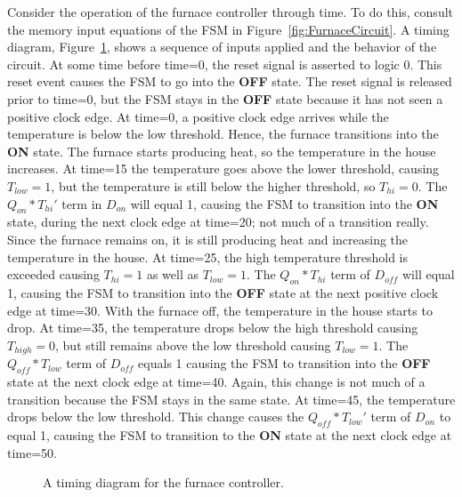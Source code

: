 Consider the operation of the furnace controller through time.
To do this, consult the memory input equations of the
FSM in Figure~\ref{fig:FurnaceCircuit}.  A timing diagram, Figure~\ref{fig:FurnaceTime}, 
shows a sequence of inputs applied and the
behavior of the circuit. At some time before time=0, the reset signal is
asserted to logic 0.  This reset event causes the FSM to go into the 
{\bf OFF} state.  The 
reset signal is released prior to time=0, but the FSM stays in the {\bf OFF}
state because it has not seen a positive clock edge.  At time=0, a positive
clock edge arrives  while the 
temperature is below the low threshold. Hence, the furnace transitions
into the {\bf ON} state.  The furnace starts producing heat, so the 
temperature in the house increases. At 
time=15 the temperature goes above the lower threshold, causing 
$T_{low}=1$, but the temperature is still below the higher threshold, so $T_{hi}=0$.
The $Q_{on}*T_{hi}'$ term in $D_{on}$ will equal 1, causing the FSM
to transition into the {\bf ON} state, during the next clock edge at time=20; 
not much of a transition really.  Since the furnace remains on, it is
still producing heat and increasing the temperature in the house.
At time=25, the high temperature threshold is exceeded causing
$T_{hi}=1$ as well as $T_{low}=1$.  The $Q_{on}*T_{hi}$ term of
$D_{off}$ will equal 1, causing the FSM to transition into the {\bf OFF}
state at the next positive clock edge at time=30.  With the furnace
off, the temperature in the house starts to drop.  At time=35, the
temperature drops below the high threshold causing $T_{high}=0$,
but still remains above the low threshold causing $T_{low}=1$.
The $Q_{off}*T_{low}$ term of $D_{off}$ equals 1 causing the
FSM to transition into the {\bf OFF} state at the next clock edge at
time=40.  Again, this change is not much of a transition because the FSM stays
in the same state.  At time=45, the temperature drops below the low 
threshold.  This change causes the $Q_{off}*T_{low}'$ term of $D_{on}$ to 
equal 1, causing the FSM to transition to the {\bf ON} state at the next 
clock edge at time=50.

\begin{figure}[ht]

\caption{A timing diagram for the furnace controller.}
\label{fig:FurnaceTime}

\end{figure}

